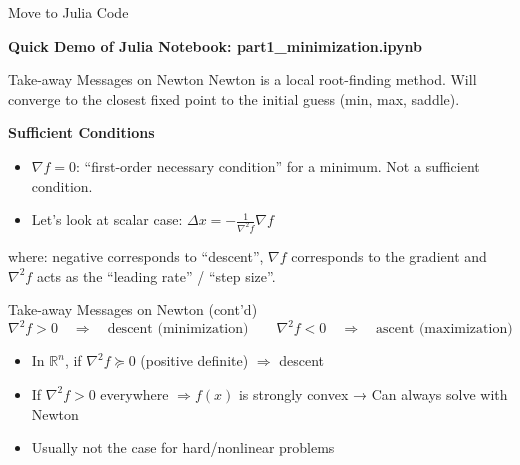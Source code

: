 \begin{frame}{Move to Julia Code}
\begin{center}
    \textbf{Quick Demo of Julia Notebook: part1\_minimization.ipynb}
\end{center}
\end{frame}



\begin{frame}{Take-away Messages on Newton}
Newton is a local root-finding method. Will converge to the closest fixed point 
to the initial guess (min, max, saddle). 

\bigskip
\textbf{Sufficient Conditions}
\begin{itemize}
    \item $\nabla f = 0$: “first-order necessary condition” for a minimum. 
    Not a sufficient condition.
    \item Let’s look at scalar case: $\Delta x = -\frac{1}{\nabla^2 f}\nabla f$
\end{itemize}

\medskip
where: negative corresponds to “descent”, $\nabla f$ corresponds to the gradient 
and $\nabla^2 f$ acts as the “leading rate” / “step size”.
\end{frame}


\begin{frame}{Take-away Messages on Newton (cont’d)}
\[
\nabla^2 f > 0 \quad \Rightarrow \quad \text{descent (minimization)} 
\qquad 
\nabla^2 f < 0 \quad \Rightarrow \quad \text{ascent (maximization)}
\]

\begin{itemize}
    \item In $\mathbb{R}^n$, if $\nabla^2 f \succeq 0$ (positive definite) $\Rightarrow$ descent
    \item If $\nabla^2 f > 0$ everywhere $\Rightarrow f(x)$ is strongly convex → Can always solve with Newton
    \item Usually not the case for hard/nonlinear problems
\end{itemize}
\end{frame}

